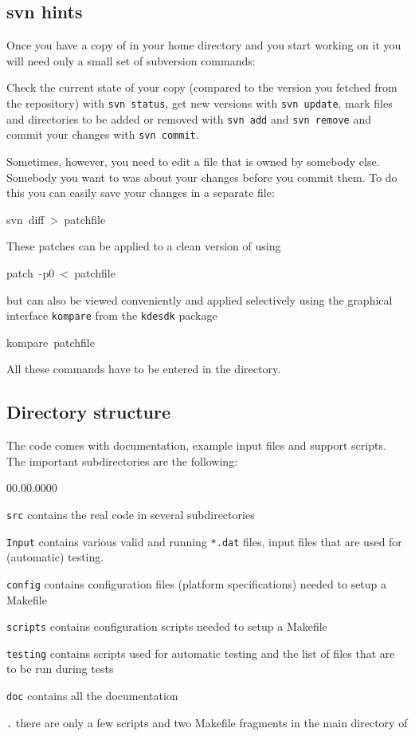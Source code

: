 \subsection{svn hints}

Once you have a copy of \ccarat{} in your home directory and you start
working on it you will need only a small set of subversion commands:

Check the current state of your copy (compared to the version
\ccarat{} you fetched from the repository) with \texttt{svn~status}, get
new versions with \texttt{svn~update}, mark files and directories to
be added or removed with \texttt{svn~add} and \texttt{svn~remove}
and commit your changes with \texttt{svn~commit}.

Sometimes, however, you need to edit a file that is owned by somebody
else. Somebody you want to was about your changes before you commit
them. To do this you can easily save your changes in a separate file:
\begin{lyxcode}
svn~diff~>~patchfile
\end{lyxcode}
These patches can be applied to a clean version of \ccarat{} using
\begin{lyxcode}
patch~-p0~<~patchfile
\end{lyxcode}
but can also be viewed conveniently and applied selectively using the
graphical interface \texttt{kompare} from the \texttt{kdesdk} package
\begin{lyxcode}
kompare~patchfile
\end{lyxcode}
All these commands have to be entered in the \ccarat{} directory.

\subsection{Directory structure}

The \ccarat{} code comes with documentation, example input files
and support scripts. The important subdirectories are the following:

\begin{lyxlist}{00.00.0000}
\item [{\texttt{src}}] contains the real \ccarat{} code in several subdirectories 
\item [{\texttt{Input}}] contains various valid and running \texttt{{*}.dat}
files, \ccarat{} input files that are used for (automatic) testing.
\item [{\texttt{config}}] contains configuration files (platform specifications)
needed to setup a \ccarat{} Makefile
\item [{\texttt{scripts}}] contains configuration scripts needed to setup
a \ccarat{} Makefile
\item [{\texttt{testing}}] contains scripts used for automatic testing
and the list of files that are to be run during tests
\item [{\texttt{doc}}] contains all the documentation
\item [{\texttt{.}}] there are only a few scripts and two Makefile fragments
in the main directory of \ccarat{} 
\end{lyxlist}

